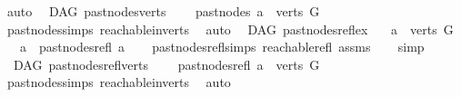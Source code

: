 \begin{isabellebody}
\ auto%
\endisatagproof
{\isafoldproof}%
%
\isadelimproof
\isanewline
%
\endisadelimproof
\isanewline
{}\isamarkupfalse%
\ {\isacharparenleft}{\kern0pt}\ DAG{\isacharparenright}{\kern0pt}\ past{\isacharunderscore}{\kern0pt}nodes{\isacharunderscore}{\kern0pt}verts{\isacharcolon}{\kern0pt}\ \isanewline
\ \ \ {\isachardoublequoteopen}past{\isacharunderscore}{\kern0pt}nodes\ a\ {\isasymsubseteq}\ verts\ G{\isachardoublequoteclose}\isanewline
%
\isadelimproof
\ \ %
\endisadelimproof
%
\isatagproof
{}\isamarkupfalse%
\ past{\isacharunderscore}{\kern0pt}nodes{\isachardot}{\kern0pt}simps\ reachable{}{\isacharunderscore}{\kern0pt}in{\isacharunderscore}{\kern0pt}verts\ \isamarkupfalse%
\ auto%
\endisatagproof
{\isafoldproof}%
%
\isadelimproof
\isanewline
%
\endisadelimproof
\isanewline
{}\isamarkupfalse%
\ {\isacharparenleft}{\kern0pt}\ DAG{\isacharparenright}{\kern0pt}\ past{\isacharunderscore}{\kern0pt}nodes{\isacharunderscore}{\kern0pt}refl{\isacharunderscore}{\kern0pt}ex{\isacharcolon}{\kern0pt}\isanewline
\ \ \ {\isachardoublequoteopen}a\ {\isasymin}\ verts\ G{\isachardoublequoteclose}\isanewline
\ \ \ {\isachardoublequoteopen}a\ {\isasymin}\ past{\isacharunderscore}{\kern0pt}nodes{\isacharunderscore}{\kern0pt}refl\ a{\isachardoublequoteclose}\isanewline
%
\isadelimproof
\ \ %
\endisadelimproof
%
\isatagproof
{}\isamarkupfalse%
\ past{\isacharunderscore}{\kern0pt}nodes{\isacharunderscore}{\kern0pt}refl{\isachardot}{\kern0pt}simps\ reachable{\isacharunderscore}{\kern0pt}refl\ assms\isanewline
\ \ \isamarkupfalse%
\ simp%
\endisatagproof
{\isafoldproof}%
%
\isadelimproof
\isanewline
%
\endisadelimproof
\isanewline
{}\isamarkupfalse%
\ {\isacharparenleft}{\kern0pt}\ DAG{\isacharparenright}{\kern0pt}\ past{\isacharunderscore}{\kern0pt}nodes{\isacharunderscore}{\kern0pt}refl{\isacharunderscore}{\kern0pt}verts{\isacharcolon}{\kern0pt}\ \isanewline
\ \ \ {\isachardoublequoteopen}past{\isacharunderscore}{\kern0pt}nodes{\isacharunderscore}{\kern0pt}refl\ a\ {\isasymsubseteq}\ verts\ G{\isachardoublequoteclose}\isanewline
%
\isadelimproof
\ \ %
\endisadelimproof
%
\isatagproof
{}\isamarkupfalse%
\ past{\isacharunderscore}{\kern0pt}nodes{\isachardot}{\kern0pt}simps\ reachable{\isacharunderscore}{\kern0pt}in{\isacharunderscore}{\kern0pt}verts\ \isamarkupfalse%
\ auto%
\endisatagproof
{\isafoldproof}%
%
\isadelimproof

\end{isabellebody}
